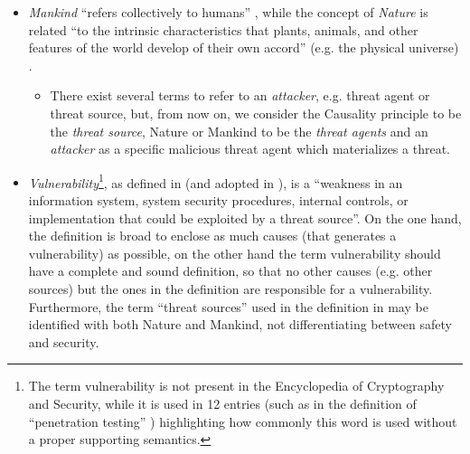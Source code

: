 \documentclass[conference]{IEEEtran}
\begin{document}
\begin{itemize}
	\item \emph{Mankind} ``refers collectively to humans''
\autocite{wiki-mankind}, while the concept of \emph{Nature} is
		related ``to the intrinsic characteristics that plants,
		animals, and other features of the world develop of their own
		accord'' (e.g. the physical universe) \autocite{wiki-nature}. 
		\begin{itemize}
			\item There exist several terms to refer to an
				\emph{attacker}, e.g. threat agent or threat source,
				but, from now on, we consider the
				Causality principle to be the \emph{threat
				source}, Nature or Mankind to be the
				\emph{threat agents} and an \emph{attacker} as
				a specific malicious threat agent which materializes a
				threat.
		\end{itemize}
	\item \emph{Vulnerability}\footnote{The term vulnerability is not
		present in the Encyclopedia of Cryptography and Security, while
		it is used in 12 entries (such as in the definition of
		``penetration testing'' \autocite{caddy2005pentest})
		highlighting how commonly this word is used without a proper
		supporting semantics.}, as defined in \autocite{cnssi20104009}
		(and adopted in \autocite{nist2013800-53}), is a ``weakness in an
		information system, system security procedures, internal
		controls, or implementation that could be exploited by a threat
		source''. On the one hand, the definition is broad to enclose
		as much causes (that generates a vulnerability) as possible,
		on the other hand the term vulnerability should have a complete and sound
		definition, so that no other causes (e.g.  other sources) but
		the ones in the definition are responsible for a vulnerability.
		Furthermore, the term ``threat sources'' used in the definition
		in \autocite{cnssi20104009} may be identified with both Nature
		and Mankind, not differentiating between safety and security.
\end{itemize}
\end{document}
